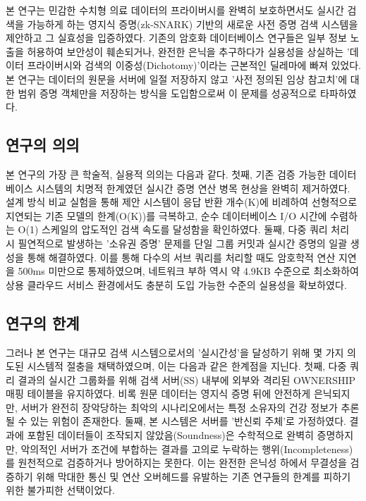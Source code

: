 
본 연구는 민감한 수치형 의료 데이터의 프라이버시를 완벽히 보호하면서도 실시간 검색을 가능하게 하는 영지식 증명(zk-SNARK) 기반의 새로운 사전 증명 검색 시스템을 제안하고 그 실효성을 입증하였다. 기존의 암호화 데이터베이스 연구들은 일부 정보 노출을 허용하여 보안성이 훼손되거나, 완전한 은닉을 추구하다가 실용성을 상실하는 '데이터 프라이버시와 검색의 이중성(Dichotomy)'이라는 근본적인 딜레마에 빠져 있었다. 본 연구는 데이터의 원문을 서버에 일절 저장하지 않고 '사전 정의된 임상 참고치'에 대한 범위 증명 객체만을 저장하는 방식을 도입함으로써 이 문제를 성공적으로 타파하였다.

\subsection{연구의 의의}
본 연구의 가장 큰 학술적, 실용적 의의는 다음과 같다. 첫째, 기존 검증 가능한 데이터베이스 시스템의 치명적 한계였던 실시간 증명 연산 병목 현상을 완벽히 제거하였다. 설계 방식 비교 실험을 통해 제안 시스템이 응답 반환 개수(K)에 비례하여 선형적으로 지연되는 기존 모델의 한계(O(K))를 극복하고, 순수 데이터베이스 I/O 시간에 수렴하는 O(1) 스케일의 압도적인 검색 속도를 달성함을 확인하였다. 둘째, 다중 쿼리 처리 시 필연적으로 발생하는 '소유권 증명' 문제를 단일 그룹 커밋과 실시간 증명의 일괄 생성을 통해 해결하였다. 이를 통해 다수의 서브 쿼리를 처리할 때도 암호학적 연산 지연을 500ms 미만으로 통제하였으며, 네트워크 부하 역시 약 4.9KB 수준으로 최소화하여 상용 클라우드 서비스 환경에서도 충분히 도입 가능한 수준의 실용성을 확보하였다.

\subsection{연구의 한계} 
그러나 본 연구는 대규모 검색 시스템으로서의 '실시간성'을 달성하기 위해 몇 가지 의도된 시스템적 절충을 채택하였으며, 이는 다음과 같은 한계점을 지닌다. 첫째, 다중 쿼리 결과의 실시간 그룹화를 위해 검색 서버(SS) 내부에 외부와 격리된 OWNERSHIP 매핑 테이블을 유지하였다. 비록 원문 데이터는 영지식 증명 뒤에 안전하게 은닉되지만, 서버가 완전히 장악당하는 최악의 시나리오에서는 특정 소유자의 건강 정보가 추론될 수 있는 위험이 존재한다. 둘째, 본 시스템은 서버를 '반신뢰 주체'로 가정하였다. 결과에 포함된 데이터들이 조작되지 않았음(Soundness)은 수학적으로 완벽히 증명하지만, 악의적인 서버가 조건에 부합하는 결과를 고의로 누락하는 행위(Incompleteness)를 원천적으로 검증하거나 방어하지는 못한다. 이는 완전한 은닉성 하에서 무결성을 검증하기 위해 막대한 통신 및 연산 오버헤드를 유발하는 기존 연구들의 한계를 피하기 위한 불가피한 선택이었다.


